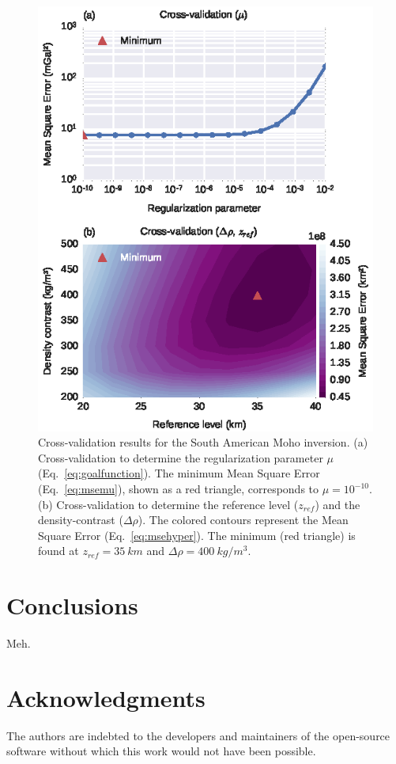 \documentclass[extra]{gji}
\begin{document}
\begin{figure}
    \centering
    \includegraphics{figures/south-america-cv}
    \caption{
        Cross-validation results for the South American Moho inversion.
        (a) Cross-validation to determine the regularization parameter $\mu$
        (Eq.~\ref{eq:goalfunction}).
        The minimum Mean Square Error (Eq.~\ref{eq:msemu}),
        shown as a red triangle,
        corresponds to $\mu = 10^{-10}$.
        (b) Cross-validation to determine
        the reference level ($z_{ref}$) and the density-contrast ($\Delta\rho$).
        The colored contours represent
        the Mean Square Error (Eq.~\ref{eq:msehyper}).
        The minimum (red triangle) is found at $z_{ref} = 35\ km$
        and $\Delta\rho = 400\ kg/m^3$.
    }
    \label{fig:sam-cv}
\end{figure}



\section{Conclusions}

Meh.

\section{Acknowledgments}

The authors are indebted to the developers and maintainers of the open-source
software without which this work would not have been possible.



\end{document}
